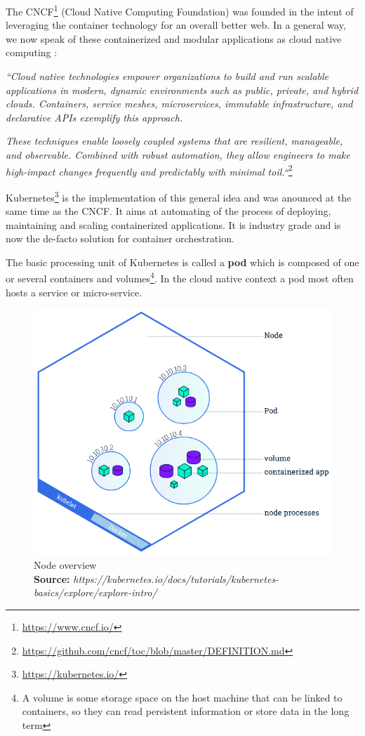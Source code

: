 \documentclass[12pt, a4paper]{memoir}
\newcommand*{\captionsource}[2]{%
    \caption[{#1}]{%
        #1%
        \\\hspace{\linewidth}%
	\textbf{Source:} \textit{#2}%
    }%
}
\begin{document}
The CNCF\footnote{\url{https://www.cncf.io/}} (Cloud Native Computing
Foundation) was founded in the intent of leveraging the container technology
for an overall better web. In a general way, we now speak of these
containerized and modular applications as cloud native computing :

\textit{``Cloud native technologies empower organizations to build and run
	scalable applications in modern, dynamic environments such as public,
	private, and hybrid clouds. Containers, service meshes, microservices,
	immutable infrastructure, and declarative APIs exemplify this
	approach.}

\textit{These techniques enable loosely coupled systems that
	are resilient, manageable, and observable.  Combined with robust
	automation, they allow engineers to make high-impact changes frequently
	and predictably with minimal toil.``}\footnote{\url{https://github.com/cncf/toc/blob/master/DEFINITION.md}}

Kubernetes\footnote{\url{https://kubernetes.io/}} is the implementation of this
general idea and was anounced at the same time as the CNCF. It aims at
automating of the process of deploying, maintaining and scaling containerized
applications. It is industry grade and is now the de-facto solution for
container orchestration.

The basic processing unit of Kubernetes is called a \textbf{pod} which is
composed of one or several containers and volumes\footnote{A volume is some
	storage space on the host machine that can be linked to containers, so
	they can read persistent information or store data in the long term}.
In the cloud native context a pod most often hosts a service or micro-service.

\begin{figure}[h]
	\centering
	\includegraphics[scale=0.5]{./imgs/node-overview.png}
	\captionsource{Node overview}{https://kubernetes.io/docs/tutorials/kubernetes-basics/explore/explore-intro/}
	\label{fig:node-overview}
\end{figure}
\end{document}

